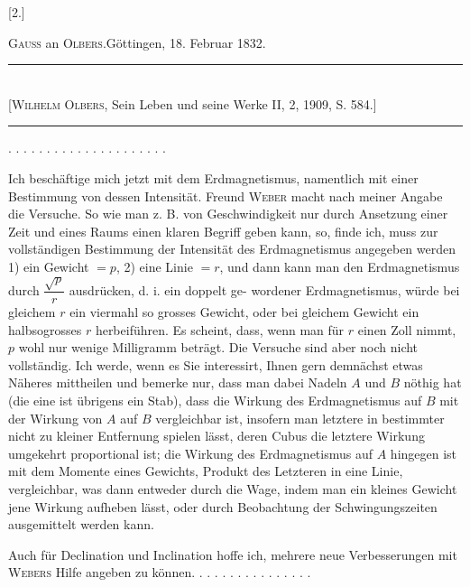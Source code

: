 \clearpage\begingroup{}\NoSourceHead
\begin{center}[2.]\end{center}
\begin{center}\textsc{Gauss} an \textsc{Olbers}.\quad Göttingen, 18. Februar 1832.\end{center}
\begin{center}
\rule{.70\textwidth}{.4pt}\\
{\small [\textsc{Wilhelm Olbers}, Sein Leben und seine Werke II, 2, 1909, S. 584.]}\\[-.3ex]
\rule{.70\textwidth}{.4pt}
\end{center}
\noindent . . . . . . . . . . . . . . . . . . . . .\par
\indent Ich beschäftige mich jetzt mit dem Erdmagnetismus, namentlich mit einer
 Bestimmung von dessen Intensität. Freund \textsc{Weber} macht nach
meiner Angabe die Versuche. So wie man z. B. von Geschwindigkeit nur
durch Ansetzung einer Zeit und eines Raums einen klaren Begriff geben kann,
so, finde ich, muss zur vollständigen Bestimmung der Intensität des Erdmagnetismus
angegeben werden 1) ein Gewicht \(=p\), 2) eine Linie \(=r\), und dann
kann man den Erdmagnetismus durch \(\dfrac{\sqrt p}{r}\) ausdrücken, d. i. ein doppelt ge-
\clearpage{}
\noindent wordener Erdmagnetismus, würde bei gleichem \(r\) ein viermahl so grosses Gewicht,
oder bei gleichem Gewicht ein halbsogrosses \(r\) herbeiführen. Es
scheint, dass, wenn man für \(r\) einen Zoll nimmt, \(p\) wohl nur wenige Milligramm
beträgt. Die Versuche sind aber noch nicht vollständig. Ich werde,
wenn es Sie interessirt, Ihnen gern demnächst etwas Näheres mittheilen und
bemerke nur, dass man dabei  Nadeln \(A\) und \(B\) nöthig hat (die eine ist
übrigens ein Stab), dass die Wirkung des Erdmagnetismus auf \(B\) mit der
Wirkung von \(A\) auf \(B\) vergleichbar ist, insofern man letztere in bestimmter
nicht zu kleiner Entfernung spielen lässt, deren Cubus die letztere Wirkung
umgekehrt proportional ist; die Wirkung des Erdmagnetismus auf \(A\) hingegen
ist mit dem Momente eines Gewichts, Produkt des Letzteren in eine Linie,
vergleichbar, was dann entweder durch die Wage, indem man ein kleines
Gewicht jene Wirkung aufheben lässt, oder durch Beobachtung der Schwingungszeiten
ausgemittelt werden kann.

Auch für Declination und Inclination hoffe ich, mehrere neue Verbesserungen
mit \textsc{Webers} Hilfe angeben zu können. . . . . . . . . . . . . . . .
\clearpage\endgroup
